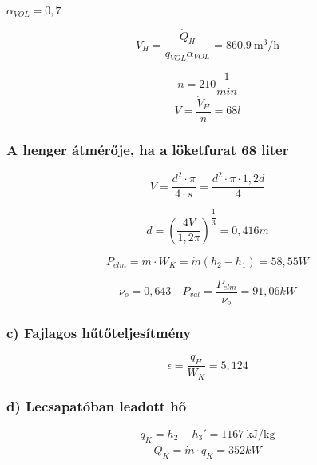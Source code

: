 \noindent $ {\alpha}_{VOL} = 0,7 $

\begin{equation}
    {\dot{V}}_{H}= \dfrac{{\dot{Q}}_H}{{q}_{VOL} {\alpha}_{VOL}} = \SI{860,9}{\meter\cubed\per\hour}
\end{equation}

\begin{equation}
   n=210 \dfrac{1}{min}
\end{equation}
\begin{equation}
    V = \dfrac{{\dot{V}}_{H}}{n} = 68 l 
\end{equation}

\subsubsection*{A henger átmérője, ha a löketfurat 68 liter}

\begin{equation}
    V=\dfrac{d^2\cdot\pi}{4\cdot s} = \dfrac{d^2\cdot\pi\cdot 1,2d}{4}
\end{equation}

\begin{equation}
     d =\left(\dfrac{4V}{1,2\pi}\right)^{\dfrac{1}{3}} = 0,416 m
\end{equation}

\begin{equation}
     {P}_{elm}=\dot{m} \cdot W_K = \dot{m} (h_2 - h_1)=58,55 W
\end{equation}

\begin{equation}
     \nu_o = 0,643
     \quad
     {P}_{val} = \dfrac{{P}_{elm}}{\nu_o} = 91,06 kW
\end{equation}

\subsubsection* { c) Fajlagos hűtőteljesítmény }

\begin{equation}
     \epsilon = \dfrac{q_H}{W_K} = 5,124
\end{equation}

\subsubsection* {d) Lecsapatóban leadott hő}

\begin{equation}
     q_K = h_2 - h_ 3' = \SI{1167}{\kilo\joule\per\kilogram}
\end{equation}
\begin{equation}
     \dot{Q}_K = \dot{m} \cdot q_K = 352 kW
\end{equation}

